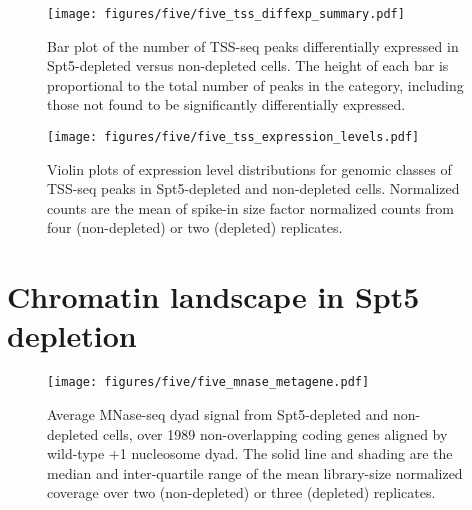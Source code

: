 \begin{figure}[H]
    \centering
    \begin{minipage}[t]{2.875in}
        \centering
        \texttt{[image: figures/five/five\_tss\_diffexp\_summary.pdf]}
        \caption[Bar plot of the number of TSS-seq peaks in various genomic classes differentially expressed in Spt5 depleted versus non-depleted cells.]{Bar plot of the number of TSS-seq peaks differentially expressed in Spt5-depleted versus non-depleted cells. The height of each bar is proportional to the total number of peaks in the category, including those not found to be significantly differentially expressed.}
        \label{fig:six_tss_diffexp_summary}
    \end{minipage}\hfill
    \begin{minipage}[t]{2.875in}
        \centering
        \texttt{[image: figures/five/five\_tss\_expression\_levels.pdf]}
        \caption[Violin plots of expression level distributions for genomic classes of TSS-seq peaks in Spt5-depleted and non-depleted cells.]{Violin plots of expression level distributions for genomic classes of TSS-seq peaks in Spt5-depleted and non-depleted cells. Normalized counts are the mean of spike-in size factor normalized counts from four (non-depleted) or two (depleted) replicates.}
        \label{fig:five_tss_expression_levels}
    \end{minipage}
\end{figure}

\lipsum[1]

\section{Chromatin landscape in Spt5 depletion}

\begin{wrapfigure}[14]{r}{3in}
    \texttt{[image: figures/five/five\_mnase\_metagene.pdf]}
    \caption[Average MNase-seq dyad signal from Spt5 depleted and non-depleted cells, over non-overlapping coding genes.]{Average MNase-seq dyad signal from Spt5-depleted and non-depleted cells, over 1989 non-overlapping coding genes aligned by wild-type +1 nucleosome dyad. The solid line and shading are the median and inter-quartile range of the mean library-size normalized coverage over two (non-depleted) or three (depleted) replicates.}
    \label{fig:five_mnase_metagene}
\end{wrapfigure}

\lipsum[1]

